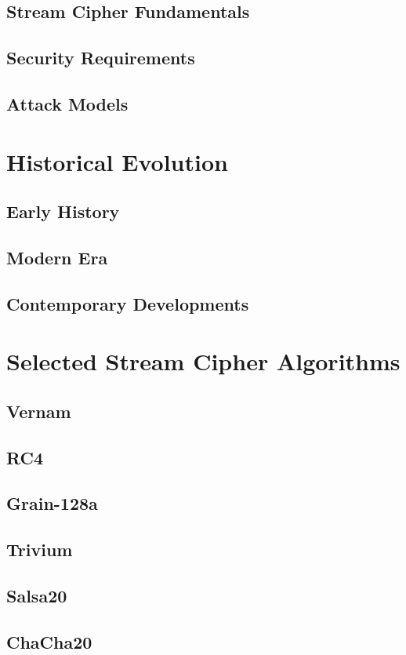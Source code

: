 \documentclass[12pt,a4paper,oneside]{report}
\begin{document}
\section{Stream Cipher Fundamentals}
\section{Security Requirements}
\section{Attack Models}

\chapter{Historical Evolution}
\section{Early History}
\section{Modern Era}
\section{Contemporary Developments}

\chapter{Selected Stream Cipher Algorithms}
\section{Vernam}
\section{RC4}
\section{Grain-128a}
\section{Trivium}
\section{Salsa20}
\section{ChaCha20}
\end{document}
